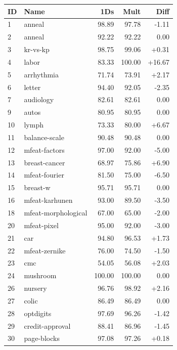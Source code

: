 \documentclass{article}
\begin{document}
\begin{table}[ht]
    \centering
    \scriptsize
    \begin{tabular}{llrrr}
        \hline
        ID & Name & 1Ds & Mult & Diff \\
        \hline \hline
        1 & anneal & 98.89 & 97.78 & -1.11 \\
        2 & anneal & 92.22 & 92.22 & 0.00 \\
        3 & kr-vs-kp & 98.75 & 99.06 & +0.31 \\
        4 & labor & 83.33 & 100.00 & +16.67 \\
        5 & arrhythmia & 71.74 & 73.91 & +2.17 \\
        6 & letter & 94.40 & 92.05 & -2.35 \\
        7 & audiology & 82.61 & 82.61 & 0.00 \\
        9 & autos & 80.95 & 80.95 & 0.00 \\
        10 & lymph & 73.33 & 80.00 & +6.67 \\
        11 & balance-scale & 90.48 & 90.48 & 0.00 \\
        12 & mfeat-factors & 97.00 & 92.00 & -5.00 \\
        13 & breast-cancer & 68.97 & 75.86 & +6.90 \\
        14 & mfeat-fourier & 81.50 & 75.00 & -6.50 \\
        15 & breast-w & 95.71 & 95.71 & 0.00 \\
        16 & mfeat-karhunen & 93.00 & 89.50 & -3.50 \\
        18 & mfeat-morphological & 67.00 & 65.00 & -2.00 \\
        20 & mfeat-pixel & 95.00 & 92.00 & -3.00 \\
        21 & car & 94.80 & 96.53 & +1.73 \\
        22 & mfeat-zernike & 76.00 & 74.50 & -1.50 \\
        23 & cmc & 54.05 & 56.08 & +2.03 \\
        24 & mushroom & 100.00 & 100.00 & 0.00 \\
        26 & nursery & 96.76 & 98.92 & +2.16 \\
        27 & colic & 86.49 & 86.49 & 0.00 \\
        28 & optdigits & 97.69 & 96.26 & -1.42 \\
        29 & credit-approval & 88.41 & 86.96 & -1.45 \\
        30 & page-blocks & 97.08 & 97.26 & +0.18 \\

\end{tabular}
\end{table}
\end{document}
